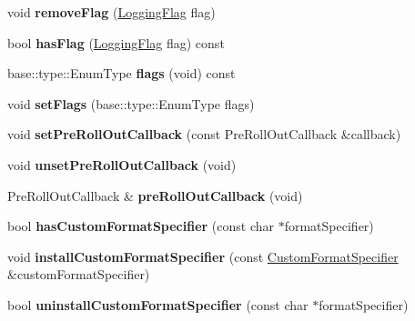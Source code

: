 \begin{DoxyCompactItemize}
\item 
\hypertarget{a00086_aaecbb6ae954d0bf748ac7f3c980a9173}{}void {\bfseries remove\+Flag} (\hyperlink{a00183_a2784aacd04cb7816ac1c0b20fcbf83cb}{Logging\+Flag} flag)\label{a00086_aaecbb6ae954d0bf748ac7f3c980a9173}

\item 
\hypertarget{a00086_ab569cf6e09897b0520dee7f4d1fb742e}{}bool {\bfseries has\+Flag} (\hyperlink{a00183_a2784aacd04cb7816ac1c0b20fcbf83cb}{Logging\+Flag} flag) const \label{a00086_ab569cf6e09897b0520dee7f4d1fb742e}

\item 
\hypertarget{a00086_a0a8da674f034011c50b0479307677855}{}base\+::type\+::\+Enum\+Type {\bfseries flags} (void) const \label{a00086_a0a8da674f034011c50b0479307677855}

\item 
\hypertarget{a00086_a5df88c56b8d923c20568e50ceb0bdd64}{}void {\bfseries set\+Flags} (base\+::type\+::\+Enum\+Type flags)\label{a00086_a5df88c56b8d923c20568e50ceb0bdd64}

\item 
\hypertarget{a00086_a626165bc5c8808b733707294ce2a0dc8}{}void {\bfseries set\+Pre\+Roll\+Out\+Callback} (const Pre\+Roll\+Out\+Callback \&callback)\label{a00086_a626165bc5c8808b733707294ce2a0dc8}

\item 
\hypertarget{a00086_a2bfdc3a20eeafe158ee8603c805131e4}{}void {\bfseries unset\+Pre\+Roll\+Out\+Callback} (void)\label{a00086_a2bfdc3a20eeafe158ee8603c805131e4}

\item 
\hypertarget{a00086_a90a3a886437746acae51cacbd5731572}{}Pre\+Roll\+Out\+Callback \& {\bfseries pre\+Roll\+Out\+Callback} (void)\label{a00086_a90a3a886437746acae51cacbd5731572}

\item 
\hypertarget{a00086_ae953cb6e8acafa96c5c1ab2f4826a4a5}{}bool {\bfseries has\+Custom\+Format\+Specifier} (const char $\ast$format\+Specifier)\label{a00086_ae953cb6e8acafa96c5c1ab2f4826a4a5}

\item 
\hypertarget{a00086_a355aac8191ab98869a52394cc868a315}{}void {\bfseries install\+Custom\+Format\+Specifier} (const \hyperlink{a00017}{Custom\+Format\+Specifier} \&custom\+Format\+Specifier)\label{a00086_a355aac8191ab98869a52394cc868a315}

\item 
\hypertarget{a00086_a68e1d3e0b657418ddb0f62f60fe979d2}{}bool {\bfseries uninstall\+Custom\+Format\+Specifier} (const char $\ast$format\+Specifier)\label{a00086_a68e1d3e0b657418ddb0f62f60fe979d2}


\end{DoxyCompactItemize}
